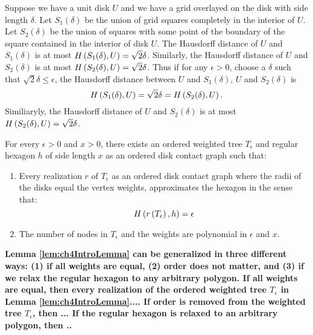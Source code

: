 Suppose we have a unit disk $U$ and we have a grid overlayed on the disk with side length $\delta$.  
Let $S_1(\delta)$ be the union of grid squares completely in the interior of $U$.  
Let $S_2(\delta)$ be the union of squares with some point of the boundary of the square contained in the interior of disk $U$.  
The Hausdorff distance of $U$ and $S_1(\delta)$ is at most $H\left( S_1(\delta), U \right)=\sqrt{2}\delta$.  
Similarly, the Hausdorff distance of $U$ and $S_2(\delta)$ is at most $H\left( S_2(\delta), U \right)=\sqrt{2}\delta$.
Thus if for any $\epsilon>0$, choose a $\delta$ such that $\sqrt{2}\delta \leq \epsilon$, the Hausdorff distance between $U$ and $S_1(\delta)$, $U$ and $S_2(\delta)$ is $$H\left( S_1(\delta), U \right)=\sqrt{2}\delta=H\left( S_2(\delta), U \right).$$  
Similiaryly, the Hausdorff distance of $U$ and $S_2(\delta)$ is at most $H\left( S_2(\delta), U \right)=\sqrt{2}\delta$.



\begin{lem}\label{lem:ch4IntroLemma}
For every $\epsilon > 0$ and $x>0$, there exists an ordered weighted tree $T_\epsilon$ and regular hexagon $h$ of side length $x$ as an ordered disk contact graph such that:
\begin{enumerate}
\item Every realization $r$ of $T_\epsilon$ as an ordered disk contact graph where the radii of the disks equal the vertex weights, approximates the hexagon in the sense that:
$$H\left( r\left( T_\epsilon \right),h \right)=\epsilon$$
\item The number of nodes in $T_\epsilon$ and the weights are polynomial in $\epsilon$ and $x$.
\end{enumerate}
\end{lem} 
 

\textbf{Lemma \ref{lem:ch4IntroLemma} can be generalized in three different ways: (1) if all weights are equal, (2) order does not matter, and (3) if we relax the regular hexagon to any arbitrary polygon.  
If all weights are equal, then every realization of the ordered weighted tree $T_\epsilon$ in Lemma \ref{lem:ch4IntroLemma}....
If order is removed from the weighted tree $T_\epsilon$, then ...
If the regular hexagon is relaxed to an arbitrary polygon, then .. }